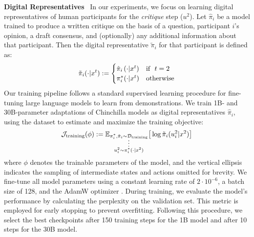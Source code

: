 \textbf{Digital Representatives}~
In our experiments, we focus on learning digital representatives of human participants for the \textit{critique} step ($u^{2}$).
%
Let $\hat{\pi}_{i}$ be a model trained to produce a written critique on the basis of a question, participant $i$'s opinion, a draft consensus, and (optionally) any additional information about that participant.
%
Then the digital representative $\tilde{\pi}_{i}$ for that participant is defined as:
%
\begin{equation}
\tilde{\pi}_{i}(\cdot|x^{t})
:=
\begin{cases}
\hat{\pi}_{i}\hspace{1.5pt}(\cdot|x^{t})&\text{if}~~t=2\\
\pi^{*}_{i}(\cdot|x^{t})&\text{otherwise}
\end{cases}
\end{equation}
%
Our training pipeline follows a standard supervised learning procedure for fine-tuning large language models to learn from demonstrations.
%
We train 1B- and 30B-parameter adaptations of Chinchilla \cite{hoffmann2022training} models as digital representatives $\hat{\pi}_{i}$, using the dataset to estimate and maximize the training objective:
%
\begin{equation}
\mathcal{J}_{\text{training}}
(\phi)
:=
\mathbb{E}_{\substack{
\pi_{i}^{*},\tilde{\pi}_{i}\sim\mathcal{D}_{\text{training}}\vspace{-5pt}\\
\vdots\\
u_{i}^{2}\sim\pi_{i}^{*}(\cdot|x^{2})
}}
\big[
\log\tilde{\pi}_{i}(u_{i}^{2}|x^{2})
\big]
\end{equation}
%
where $\phi$ denotes the trainable parameters of the model,
%
and the vertical ellipsis indicates the sampling of intermediate states and actions omitted for brevity.
% 
We fine-tune all model parameters using a constant learning rate of $2 \cdot 10^{-6}$, a batch size of 128, and the AdamW optimizer \cite{adamw}. 
During training, we evaluate the model's performance by calculating the perplexity on the validation set. This metric is employed for early stopping to prevent overfitting. Following this procedure, we select the best checkpoints after 150 training steps for the 1B model and after 10 steps for the 30B model.
%



